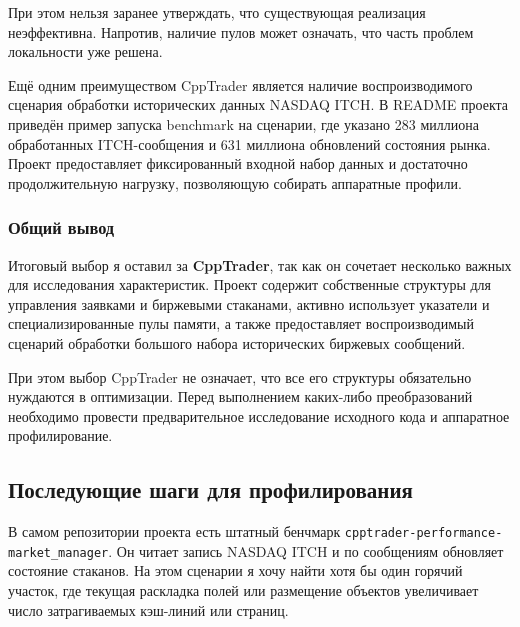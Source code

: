 \documentclass[a4paper,12pt]{article}
\begin{document}
При этом нельзя заранее утверждать, что существующая реализация
неэффективна. Напротив, наличие пулов может означать, что часть проблем
локальности уже решена.

Ещё одним преимуществом CppTrader является наличие воспроизводимого
сценария обработки исторических данных NASDAQ ITCH. В README проекта
приведён пример запуска benchmark на сценарии, где указано
283 миллиона обработанных ITCH-сообщения и 631 миллиона обновлений
состояния рынка. Проект предоставляет
фиксированный входной набор данных и достаточно продолжительную нагрузку,
позволяющую собирать аппаратные профили.


\subsubsection{Общий вывод}


Итоговый выбор я оставил за \textbf{CppTrader}, так
как он сочетает несколько важных для исследования
характеристик. Проект содержит собственные структуры для управления
заявками и биржевыми стаканами, активно использует указатели
и специализированные пулы памяти, а также предоставляет
воспроизводимый сценарий обработки большого набора исторических
биржевых сообщений.

При этом выбор CppTrader не означает, что все его структуры
обязательно нуждаются в оптимизации. Перед выполнением каких-либо
преобразований необходимо провести предварительное исследование
исходного кода и аппаратное профилирование.

\subsection{Последующие шаги для профилирования}

В самом репозитории проекта есть штатный бенчмарк
\texttt{cpptrader-\allowbreak performance-\allowbreak market\_\allowbreak manager}.
Он читает запись NASDAQ ITCH
и по сообщениям обновляет состояние стаканов. На этом сценарии я хочу
найти хотя бы один горячий участок, где текущая раскладка полей или
размещение объектов увеличивает число затрагиваемых кэш-линий или страниц.
\end{document}
